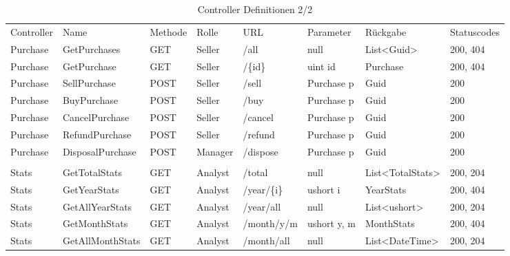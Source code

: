\begin{table}
	\caption{Controller Definitionen 2/2}
	\centering
	\label{controller2}
\begin{tabular}{llllllll}
	Controller & Name             & Methode & Rolle   & URL             & Parameter      & Rückgabe                                & Statuscodes \\
	Purchase   & GetPurchases     & GET     & Seller  & /all            & null           & List\textless{}Guid\textgreater{}       & 200, 404    \\
	Purchase   & GetPurchase      & GET     & Seller  & /\{id\}         & uint id        & Purchase                                & 200, 404    \\
	Purchase   & SellPurchase     & POST    & Seller  & /sell           & Purchase p     & Guid                                    & 200         \\
	Purchase   & BuyPurchase      & POST    & Seller  & /buy            & Purchase p     & Guid                                    & 200         \\
	Purchase   & CancelPurchase   & POST    & Seller  & /cancel         & Purchase p     & Guid                                    & 200         \\
	Purchase   & RefundPurchase   & POST    & Seller  & /refund         & Purchase p     & Guid                                    & 200         \\
	Purchase   & DisposalPurchase & POST    & Manager & /dispose        & Purchase p     & Guid                                    & 200         \\
	&                  &         &         &                 &                &                                         &             \\
	Stats      & GetTotalStats    & GET     & Analyst & /total          & null           & List\textless{}TotalStats\textgreater{} & 200, 204    \\
	Stats      & GetYearStats     & GET     & Analyst & /year/\{i\}     & ushort i       & YearStats                               & 200, 404    \\
	Stats      & GetAllYearStats  & GET     & Analyst & /year/all       & null           & List\textless{}ushort\textgreater{}     & 200, 204    \\
	Stats      & GetMonthStats    & GET     & Analyst & /month/y/m      & ushort y, m    & MonthStats                              & 200, 404    \\
	Stats      & GetAllMonthStats & GET     & Analyst & /month/all      & null           & List\textless{}DateTime\textgreater{}   & 200, 204    \\

\end{tabular}
\end{table}
